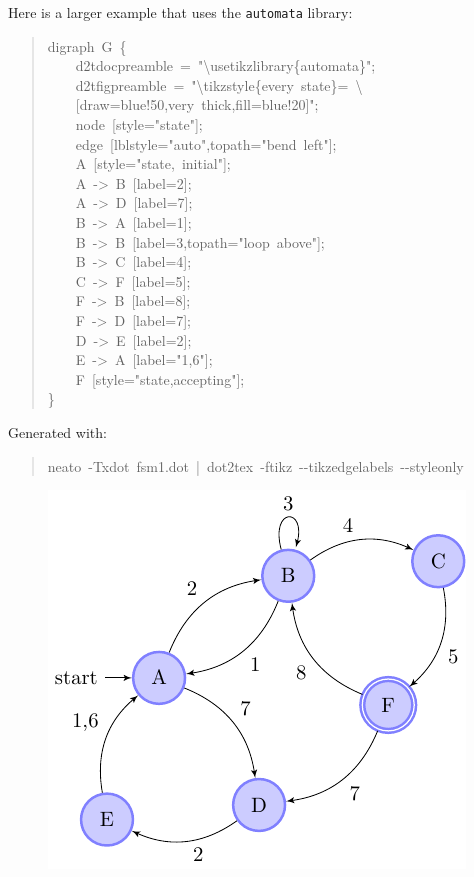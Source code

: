 \documentclass[10pt,a4paper,english]{article}
\begin{document}
Here is a larger example that uses the \texttt{automata} library:
\begin{quote}{\ttfamily \raggedright \noindent
digraph~G~{\{}~\\
~~~~d2tdocpreamble~=~"{\textbackslash}usetikzlibrary{\{}automata{\}}";~\\
~~~~d2tfigpreamble~=~"{\textbackslash}tikzstyle{\{}every~state{\}}=~{\textbackslash}~\\
~~~~{[}draw=blue!50,very~thick,fill=blue!20{]}";~\\
~~~~node~{[}style="state"{]};~\\
~~~~edge~{[}lblstyle="auto",topath="bend~left"{]};~\\
~~~~A~{[}style="state,~initial"{]};~\\
~~~~A~->~B~{[}label=2{]};~\\
~~~~A~->~D~{[}label=7{]};~\\
~~~~B~->~A~{[}label=1{]};~\\
~~~~B~->~B~{[}label=3,topath="loop~above"{]};~\\
~~~~B~->~C~{[}label=4{]};~\\
~~~~C~->~F~{[}label=5{]};~\\
~~~~F~->~B~{[}label=8{]};~\\
~~~~F~->~D~{[}label=7{]};~\\
~~~~D~->~E~{[}label=2{]};~\\
~~~~E~->~A~{[}label="1,6"{]};~\\
~~~~F~{[}style="state,accepting"{]};~\\
{\}}
}\end{quote}

Generated with:
\begin{quote}{\ttfamily \raggedright \noindent
neato~-Txdot~fsm1.dot~|~dot2tex~-ftikz~-{}-tikzedgelabels~-{}-styleonly
}\end{quote}
\begin{figure}[H]
\centering

\includegraphics{pdf/fsm1}
\end{figure}
\end{document}
